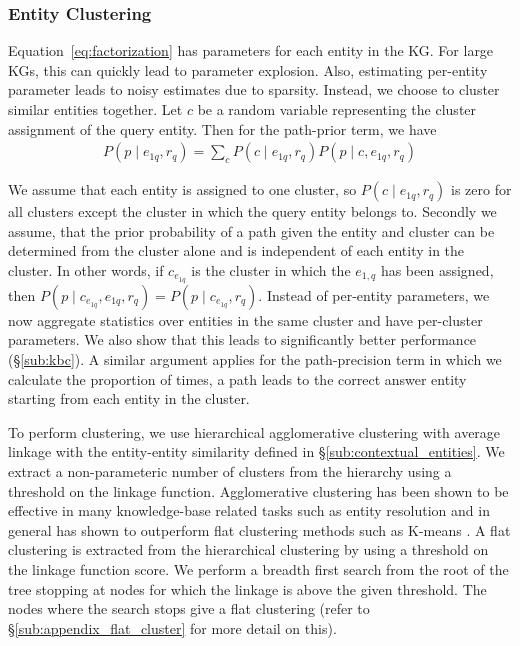 \documentclass[11pt,a4paper]{article}
\begin{document}
\subsubsection{Entity Clustering}
\label{sub:entity_clustering}
Equation~\ref{eq:factorization} has parameters for each entity in the KG. For large KGs, this can quickly lead to parameter explosion. Also, estimating per-entity parameter leads to noisy estimates due to sparsity. Instead, we choose to cluster similar entities together. Let $c$ be a random variable representing the cluster assignment of the query entity. Then for the path-prior term, we have 
\begin{align*}
    P(p \mid e_{1q}, r_q) = \sum_{c} P(c \mid e_{1q}, r_q) P(p \mid c, e_{1q}, r_q)
\end{align*}

We assume that each entity is assigned to one cluster, so $ P(c \mid e_{1q}, r_q)$ is zero for all clusters except the cluster in which the query entity belongs to. Secondly we assume, that the prior probability of a path given the entity and cluster can be determined from the cluster alone and is independent of each entity in the cluster. In other words, if $c_{e_{1q}}$ is the cluster in which the $e_{1,q}$ has been assigned, then $P(p \mid c_{e_{1q}}, e_{1q}, r_q) = P(p \mid c_{e_{1q}}, r_q)$. Instead of per-entity parameters, we now aggregate statistics over entities in the same cluster and have per-cluster parameters. We also show that this leads to significantly better performance (\S\ref{sub:kbc}). A similar argument applies for the path-precision term in which we calculate the proportion of times, a path leads to the correct answer entity starting from each entity in the cluster.

To perform clustering, we use hierarchical agglomerative clustering with average linkage with the entity-entity similarity defined in \S \ref{sub:contextual_entities}. 
We extract a non-parameteric number of clusters from the hierarchy using a threshold on the linkage function. Agglomerative clustering has been shown to be effective in many knowledge-base related 
tasks such as entity resolution \cite{lee-etal-2012-joint,vashishth2018cesi} and in general has shown to 
outperform flat clustering methods such as K-means \cite{green2012entity,kobren2017hierarchical}. A flat clustering is extracted from the hierarchical clustering by using a threshold on the linkage function score. We perform a breadth first search from the root of the tree stopping at nodes for which the linkage is above the given threshold. The nodes where the search stops give a flat clustering (refer to \S\ref{sub:appendix_flat_cluster} for more detail on this).
\end{document}

